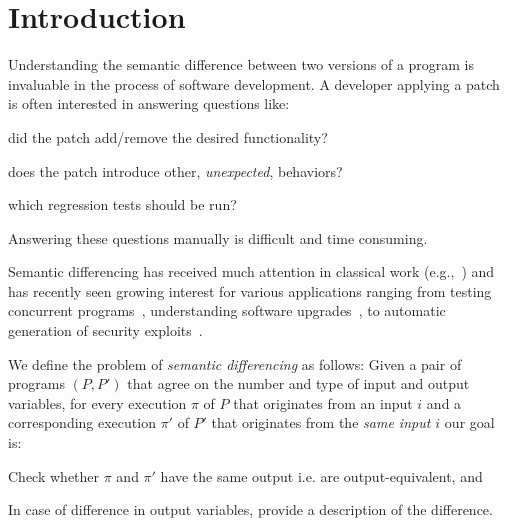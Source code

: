 \section{Introduction} 



Understanding the semantic difference between two versions of a program is invaluable in the process of software development. A developer applying a patch is often interested in answering questions like:
\begin{inparaenum}[(i)]
\item did the patch add/remove the desired functionality?
\item does the patch introduce other, \emph{unexpected}, behaviors?
\item which regression tests should be run?
\end{inparaenum}
Answering these questions manually is difficult and time consuming.

Semantic differencing has received much attention in classical work (e.g.,~\cite{Horwitz90,Horwitz89,Hoare69}) and has recently seen growing interest for various applications ranging from testing concurrent programs~\cite{ChakiGurfinkelStrichman12}, understanding software upgrades~\cite{JinOrsoXie10}, to automatic generation of security exploits~\cite{BrumleyPoosankamSongZheng08}.

We define the problem of \emph{semantic differencing} as follows: Given a pair of programs $(P,P')$ that agree on the number and type of input and output variables, for every execution $\pi$ of $P$ that originates from an input $i$ and a corresponding execution $\pi'$ of $P'$ that originates from the \emph{same input $i$} our goal is:
\begin{inparaenum}[(i)]
\item Check whether $\pi$ and $\pi'$ have the same output i.e. are output-equivalent, and 
\item In case of difference in output variables, provide a description of the difference.
\end{inparaenum}

